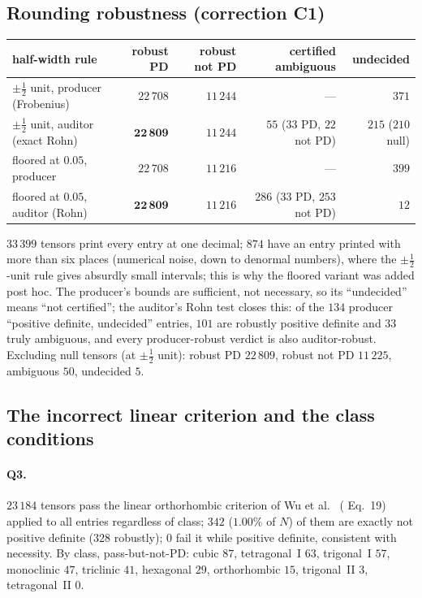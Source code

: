 \documentclass[10pt]{article}
\begin{document}
\subsection{Rounding robustness (correction C1)}
\begin{center}\small\begin{tabular}{p{5.6cm}rrrr}\toprule
half-width rule & robust PD & robust not PD & certified ambiguous & undecided\\\midrule
$\pm\tfrac12$ unit, producer (Frobenius) & $22\,708$ & $11\,244$ & --- & $371$\\
$\pm\tfrac12$ unit, auditor (exact Rohn) & $\mathbf{22\,809}$ & $11\,244$ & $55$ ($33$ PD, $22$ not PD) & $215$ ($210$ null)\\
floored at $0.05$, producer & $22\,708$ & $11\,216$ & --- & $399$\\
floored at $0.05$, auditor (Rohn) & $\mathbf{22\,809}$ & $11\,216$ & $286$ ($33$ PD, $253$ not PD) & $12$\\\bottomrule
\end{tabular}\end{center}
$33\,399$ tensors print every entry at one decimal; $874$ have an entry printed with more than six places (numerical noise, down to denormal numbers), where the $\pm\tfrac12$-unit rule gives absurdly small intervals; this is why the floored variant was added post hoc. The producer's bounds are sufficient, not necessary, so its ``undecided'' means ``not certified''; the auditor's Rohn test closes this: of the $134$ producer ``positive definite, undecided'' entries, $101$ are robustly positive definite and $33$ truly ambiguous, and every producer-robust verdict is also auditor-robust. Excluding null tensors (at $\pm\tfrac12$ unit): robust PD $22\,809$, robust not PD $11\,225$, ambiguous $50$, undecided $5$.

\subsection{The incorrect linear criterion and the class conditions}
\paragraph{Q3.} $23\,184$ tensors pass the linear orthorhombic criterion of Wu et al.\ \cite{wu} (\cite{mc} Eq.~19) applied to all entries regardless of class; $342$ ($1.00\%$ of $N$) of them are exactly not positive definite ($328$ robustly); $0$ fail it while positive definite, consistent with necessity. By class, pass-but-not-PD: cubic $87$, tetragonal~I $63$, trigonal~I $57$, monoclinic $47$, triclinic $41$, hexagonal $29$, orthorhombic $15$, trigonal~II $3$, tetragonal~II $0$.
\end{document}
